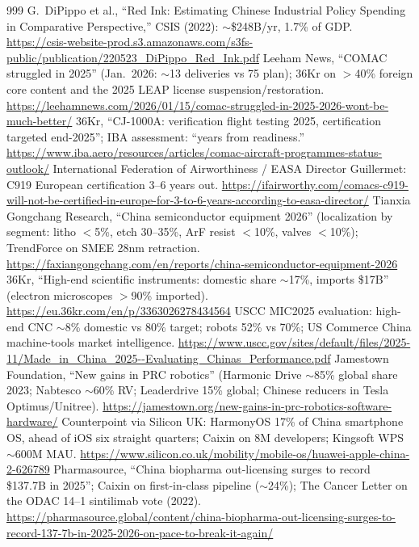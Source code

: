\begin{thebibliography}{999}
 G.~DiPippo et al., ``Red Ink: Estimating Chinese Industrial Policy Spending in Comparative Perspective,'' CSIS (2022): $\sim$\$248B/yr, 1.7\% of GDP. \url{https://csis-website-prod.s3.amazonaws.com/s3fs-public/publication/220523_DiPippo_Red_Ink.pdf}
 Leeham News, ``COMAC struggled in 2025'' (Jan.\ 2026: $\sim$13 deliveries vs 75 plan); 36Kr on $>$40\% foreign core content and the 2025 LEAP license suspension/restoration. \url{https://leehamnews.com/2026/01/15/comac-struggled-in-2025-2026-wont-be-much-better/}
 36Kr, ``CJ-1000A: verification flight testing 2025, certification targeted end-2025''; IBA assessment: ``years from readiness.'' \url{https://www.iba.aero/resources/articles/comac-aircraft-programmes-status-outlook/}
 International Federation of Airworthiness / EASA Director Guillermet: C919 European certification 3--6 years out. \url{https://ifairworthy.com/comacs-c919-will-not-be-certified-in-europe-for-3-to-6-years-according-to-easa-director/}
 Tianxia Gongchang Research, ``China semiconductor equipment 2026'' (localization by segment: litho $<$5\%, etch 30--35\%, ArF resist $<$10\%, valves $<$10\%); TrendForce on SMEE 28nm retraction. \url{https://faxiangongchang.com/en/reports/china-semiconductor-equipment-2026}
 36Kr, ``High-end scientific instruments: domestic share $\sim$17\%, imports \$17B'' (electron microscopes $>$90\% imported). \url{https://eu.36kr.com/en/p/3363026278434564}
 USCC MIC2025 evaluation: high-end CNC $\sim$8\% domestic vs 80\% target; robots 52\% vs 70\%; US Commerce China machine-tools market intelligence. \url{https://www.uscc.gov/sites/default/files/2025-11/Made_in_China_2025--Evaluating_Chinas_Performance.pdf}
 Jamestown Foundation, ``New gains in PRC robotics'' (Harmonic Drive $\sim$85\% global share 2023; Nabtesco $\sim$60\% RV; Leaderdrive 15\% global; Chinese reducers in Tesla Optimus/Unitree). \url{https://jamestown.org/new-gains-in-prc-robotics-software-hardware/}
 Counterpoint via Silicon UK: HarmonyOS 17\% of China smartphone OS, ahead of iOS six straight quarters; Caixin on 8M developers; Kingsoft WPS $\sim$600M MAU. \url{https://www.silicon.co.uk/mobility/mobile-os/huawei-apple-china-2-626789}
 Pharmasource, ``China biopharma out-licensing surges to record \$137.7B in 2025''; Caixin on first-in-class pipeline ($\sim$24\%); The Cancer Letter on the ODAC 14--1 sintilimab vote (2022). \url{https://pharmasource.global/content/china-biopharma-out-licensing-surges-to-record-137-7b-in-2025-2026-on-pace-to-break-it-again/}

\end{thebibliography}
